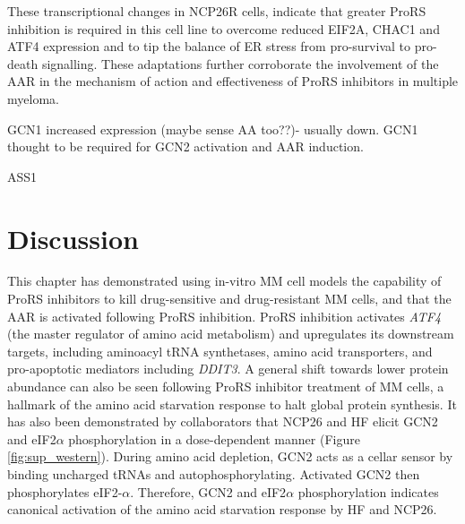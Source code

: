 These transcriptional changes in NCP26R cells, indicate that greater ProRS inhibition is required in this cell line to overcome reduced EIF2A, CHAC1 and ATF4 expression and to tip the balance of ER stress from pro-survival to pro-death signalling.
These adaptations further corroborate the involvement of the AAR in the mechanism of action and effectiveness of ProRS inhibitors in multiple myeloma.

GCN1 increased expression (maybe sense AA too??)- usually down.
GCN1 thought to be required for GCN2 activation and AAR induction\cite{kim2020aminoacyl}.

ASS1


\clearpage
\section{Discussion}
This chapter has demonstrated using in-vitro MM cell models the capability of ProRS inhibitors to kill drug-sensitive and drug-resistant MM cells, and that the AAR is activated following ProRS inhibition.
ProRS inhibition activates \textit{ATF4} (the master regulator of amino acid metabolism) and upregulates its downstream targets, including aminoacyl tRNA synthetases, amino acid transporters, and pro-apoptotic mediators including \textit{DDIT3}.
A general shift towards lower protein abundance can also be seen following ProRS inhibitor treatment of MM cells, a hallmark of the amino acid starvation response to halt global protein synthesis.
It has also been demonstrated by collaborators that NCP26 and HF elicit GCN2 and eIF2$\alpha$ phosphorylation in a dose-dependent manner (Figure \ref{fig:sup_western}).
During amino acid depletion, GCN2 acts as a cellar sensor by binding uncharged tRNAs and autophosphorylating.
Activated GCN2 then phosphorylates eIF2-$\alpha$\cite{battu2017amino}.
Therefore, GCN2 and eIF2$\alpha$ phosphorylation indicates canonical activation of the amino acid starvation response by HF and NCP26.

